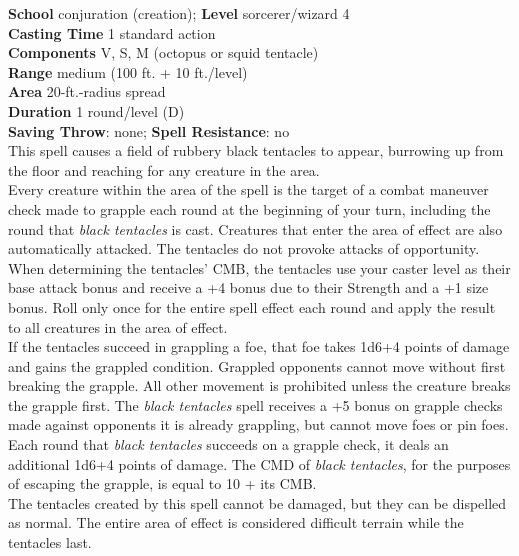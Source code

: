 \textbf{School }conjuration (creation); \textbf{Level }sorcerer/wizard 4\\
\textbf{Casting Time }1 standard action\\
\textbf{Components }V, S, M (octopus or squid tentacle)\\
\textbf{Range }medium (100 ft. + 10 ft./level)\\
\textbf{Area }20-ft.-radius spread\\
\textbf{Duration }1 round/level (D)\\
\textbf{Saving Throw}: none; \textbf{Spell Resistance}: no\\
This spell causes a field of rubbery black tentacles to appear, burrowing up from the floor and reaching for any creature in the area. \\
Every creature within the area of the spell is the target of a combat maneuver check made to grapple each round at the beginning of your turn, including the round that \textit{black tentacles} is cast. Creatures that enter the area of effect are also automatically attacked. The tentacles do not provoke attacks of opportunity. When determining the tentacles' CMB, the tentacles use your caster level as their base attack bonus and receive a +4 bonus due to their Strength and a +1 size bonus. Roll only once for the entire spell effect each round and apply the result to all creatures in the area of effect.\\
If the tentacles succeed in grappling a foe, that foe takes 1d6+4 points of damage and gains the grappled condition. Grappled opponents cannot move without first breaking the grapple. All other movement is prohibited unless the creature breaks the grapple first. The \textit{black tentacles} spell receives a +5 bonus on grapple checks made against opponents it is already grappling, but cannot move foes or pin foes. Each round that \textit{black tentacles} succeeds on a grapple check, it deals an additional 1d6+4 points of damage. The CMD of \textit{black tentacles}, for the purposes of escaping the grapple, is equal to 10 + its CMB.\\
The tentacles created by this spell cannot be damaged, but they can be dispelled as normal. The entire area of effect is considered difficult terrain while the tentacles last.\\
